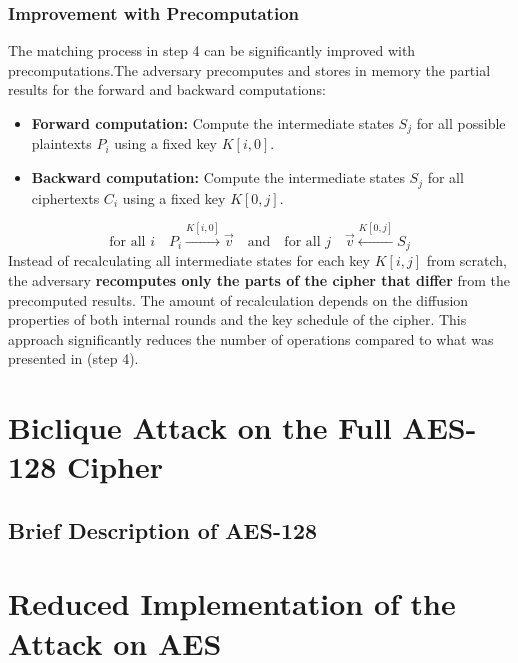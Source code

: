 \documentclass{rapport}
\begin{document}
 \subsubsection{Improvement with Precomputation}
 The matching process in step 4 can be significantly improved with precomputations.The adversary precomputes and stores in memory the partial results for the forward and backward computations:

 \begin{itemize}
    \item \textbf{Forward computation:} Compute the intermediate states $S_j$ for all possible plaintexts $P_i$ using a fixed key $K[i, 0]$.
    \item \textbf{Backward computation:} Compute the intermediate states $S_j$ for all ciphertexts $C_i$ using a fixed key $K[0, j]$.
 \end{itemize}

 \begin{equation}
    \text{for all } i \quad P_i \xrightarrow{K[i, 0]} \vec{v} \quad \text{and} \quad \text{for all } j \quad \vec{v} \xleftarrow{K[0, j]} S_j
 \end{equation}
 Instead of recalculating all intermediate states for each key $K[i, j]$ from scratch, the adversary \textbf{recomputes only the parts of the cipher that differ} from the precomputed results. The amount of recalculation depends on the diffusion properties of both internal rounds and the key schedule of the cipher. This approach significantly reduces the number of operations compared to what was presented in (step 4).


 \section{Biclique Attack on the Full AES-128 Cipher}

 \subsection{Brief Description of AES-128}

 \section{Reduced Implementation of the Attack on AES}
\end{document}
